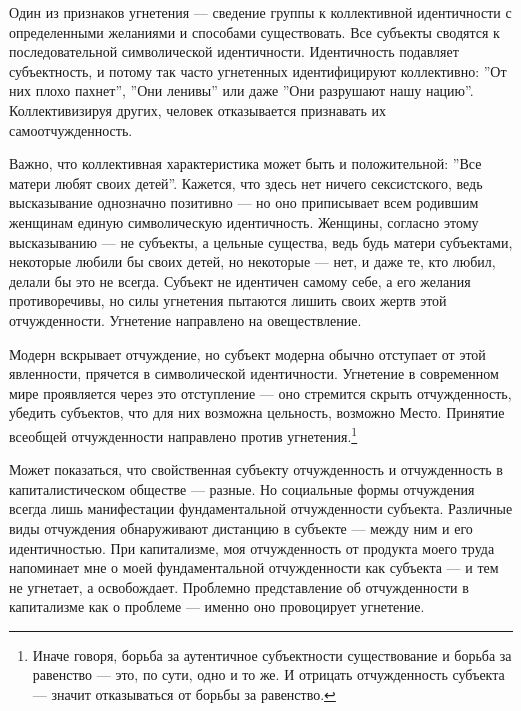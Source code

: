 \documentclass[12pt]{book}
\begin{document}
Один из признаков угнетения --- сведение группы к коллективной идентичности с определенными желаниями и способами существовать. Все субъекты сводятся к последовательной символической идентичности. Идентичность подавляет субъектность, и потому так часто угнетенных идентифицируют коллективно: ''От них плохо пахнет'', ''Они ленивы'' или даже ''Они разрушают нашу нацию''. Коллективизируя других, человек отказывается признавать их самоотчужденность.

Важно, что коллективная характеристика может быть и положительной: ''Все матери любят своих детей''. Кажется, что здесь нет ничего сексистского, ведь высказывание однозначно позитивно --- но оно приписывает всем родившим женщинам единую символическую идентичность. Женщины, согласно этому высказыванию --- не субъекты, а цельные существа, ведь будь матери субъектами, некоторые любили бы своих детей, но некоторые --- нет, и даже те, кто любил, делали бы это не всегда. Субъект не идентичен самому себе, а его желания противоречивы, но силы угнетения пытаются лишить своих жертв этой отчужденности. Угнетение направлено на овеществление.

Модерн вскрывает отчуждение, но субъект модерна обычно отступает от этой явленности, прячется в символической идентичности. Угнетение в современном мире проявляется через это отступление --- оно стремится скрыть отчужденность, убедить субъектов, что для них возможна цельность, возможно Место. Принятие всеобщей отчужденности направлено против угнетения.\footnote{Иначе говоря, борьба за аутентичное субъектности существование и борьба за равенство --- это, по сути, одно и то же. И отрицать отчужденность субъекта --- значит отказываться от борьбы за равенство.}

Может показаться, что свойственная субъекту отчужденность и отчужденность в капиталистическом обществе --- разные. Но социальные формы отчуждения всегда лишь манифестации фундаментальной отчужденности субъекта. Различные виды отчуждения обнаруживают дистанцию в субъекте --- между ним и его идентичностью. При капитализме, моя отчужденность от продукта моего труда напоминает мне о моей фундаментальной отчужденности как субъекта --- и тем не угнетает, а освобождает. Проблемно представление об отчужденности в капитализме как о проблеме --- именно оно провоцирует угнетение.
\end{document}
